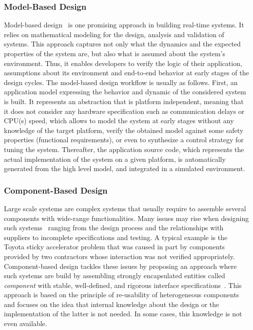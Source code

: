 \subsubsection{Model-Based Design}
Model-based design~\cite{intro:mb,intro:mb2} is one promising approach in building 
real-time systems. It relies on mathematical modeling for the design, analysis 
and validation of systems. This approach captures not only what the dynamics and the 
expected properties of the system are, but also what is assumed about the system's environment.
Thus, it enables developers to verify the logic of their
application, assumptions about its environment and end-to-end behavior at early stages of the
design cycles.
The model-based design workflow is usually as follows. 
First, an application model expressing the behavior and dynamic of the considered system is 
built. It represents an abstraction that is platform independent, meaning that it does not 
consider any hardware specification such as communication delays or CPU(s) speed, which allows 
to model the system at early stages without any knowledge of the target platform, 
verify the obtained model against some safety properties (functional requirements), or even
to synthesize a control strategy for tuning the system.
Thereafter, the application source code, which represents the actual 
implementation of the system on a given platform, is automatically generated from the high 
level model, and integrated in a simulated environment. 

\subsubsection{Component-Based Design}

Large scale systems are complex systems that usually require to assemble several
components with wide-range functionalities. Many issues may rise when designing such 
systems~\cite{intro:cb} ranging from the design process and the relationships with suppliers to 
incomplete specifications and testing. A typical example is the Toyota sticky accelerator 
problem that was caused in part by components provided by two contractors whose interaction 
was not verified appropriately.
Component-based design tackles these issues by proposing an approach where such systems
are build by assembling strongly encapsulated entities called \emph{component} with 
stable, well-defined, and rigorous interface specifications~\cite{intro:cb2}.
This approach is based on the principle of re-usability of heterogeneous components and focuses
on the idea that internal knowledge about the design or the implementation of the latter is
not needed. In some cases, this knowledge is not even available. 

